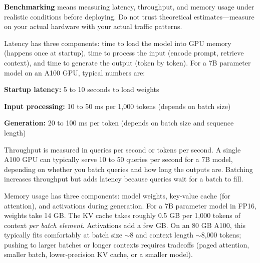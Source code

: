 \textbf{Benchmarking} means measuring latency, throughput, and memory usage under realistic conditions before deploying. Do not trust theoretical estimates---measure on your actual hardware with your actual traffic patterns.

Latency has three components: time to load the model into GPU memory (happens once at startup), time to process the input (encode prompt, retrieve context), and time to generate the output (token by token). For a 7B parameter model on an A100 GPU, typical numbers are:

\vspace{0.5em}

\textbf{Startup latency:} 5 to 10 seconds to load weights

\textbf{Input processing:} 10 to 50 ms per 1,000 tokens (depends on batch size)

\textbf{Generation:} 20 to 100 ms per token (depends on batch size and sequence length)

\vspace{0.5em}

Throughput is measured in queries per second or tokens per second. A single A100 GPU can typically serve 10 to 50 queries per second for a 7B model, depending on whether you batch queries and how long the outputs are. Batching increases throughput but adds latency because queries wait for a batch to fill.

Memory usage has three components: model weights, key-value cache (for attention), and activations during generation. For a 7B parameter model in FP16, weights take 14 GB. The KV cache takes roughly 0.5 GB per 1,000 tokens of context \emph{per batch element}. Activations add a few GB. On an 80 GB A100, this typically fits comfortably at batch size $\sim$8 and context length $\sim$8{,}000 tokens; pushing to larger batches or longer contexts requires tradeoffs (paged attention, smaller batch, lower-precision KV cache, or a smaller model).

\vspace{1.5em}

